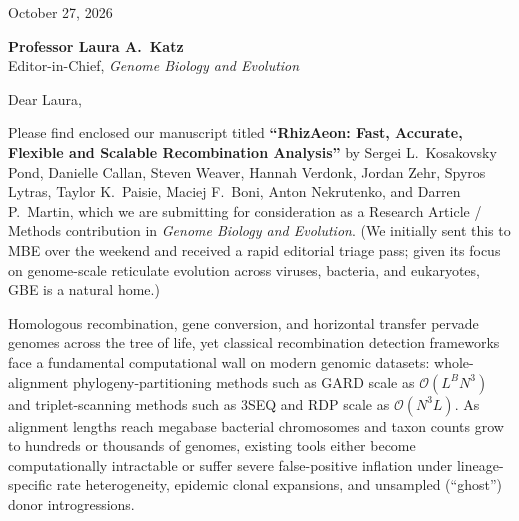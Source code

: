 \documentclass[11pt,letterpaper]{article}
\begin{document}
October 27, 2026

\textbf{Professor Laura A.\ Katz}\\
Editor-in-Chief, \textit{Genome Biology and Evolution}

Dear Laura,

Please find enclosed our manuscript titled \textbf{``RhizAeon: Fast, Accurate, Flexible and Scalable Recombination Analysis''} by Sergei L.\ Kosakovsky Pond, Danielle Callan, Steven Weaver, Hannah Verdonk, Jordan Zehr, Spyros Lytras, Taylor K.\ Paisie, Maciej F.\ Boni, Anton Nekrutenko, and Darren P.\ Martin, which we are submitting for consideration as a Research Article / Methods contribution in \textit{Genome Biology and Evolution}. (We initially sent this to MBE over the weekend and received a rapid editorial triage pass; given its focus on genome-scale reticulate evolution across viruses, bacteria, and eukaryotes, GBE is a natural home.)

Homologous recombination, gene conversion, and horizontal transfer pervade genomes across the tree of life, yet classical recombination detection frameworks face a fundamental computational wall on modern genomic datasets: whole-alignment phylogeny-partitioning methods such as GARD scale as $\mathcal{O}(L^B N^3)$ and triplet-scanning methods such as 3SEQ and RDP scale as $\mathcal{O}(N^3 L)$. As alignment lengths reach megabase bacterial chromosomes and taxon counts grow to hundreds or thousands of genomes, existing tools either become computationally intractable or suffer severe false-positive inflation under lineage-specific rate heterogeneity, epidemic clonal expansions, and unsampled (``ghost'') donor introgressions.
\end{document}
